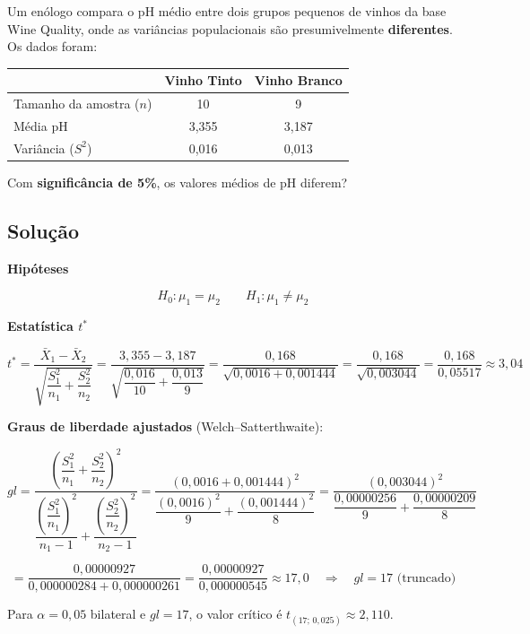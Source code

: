\documentclass[12pt,a4paper]{article}
\begin{document}
Um enólogo compara o pH médio entre dois grupos pequenos de vinhos da base Wine Quality,
onde as variâncias populacionais são presumivelmente \textbf{diferentes}. Os dados foram:

\begin{center}
\begin{tabular}{lcc}
  \toprule
  & \textbf{Vinho Tinto} & \textbf{Vinho Branco} \\
  \midrule
  Tamanho da amostra ($n$) & 10      & 9       \\
  Média pH                 & 3{,}355 & 3{,}187 \\
  Variância ($S^2$)        & 0{,}016 & 0{,}013 \\
  \bottomrule
\end{tabular}
\end{center}

Com \textbf{significância de 5\%}, os valores médios de pH diferem?

\subsection*{Solução}

\textbf{Hipóteses}

\[
  H_0: \mu_1 = \mu_2 \qquad H_1: \mu_1 \neq \mu_2
\]

\textbf{Estatística $t^*$}

\[
  t^* = \frac{\bar{X}_1 - \bar{X}_2}
             {\sqrt{\dfrac{S_1^2}{n_1} + \dfrac{S_2^2}{n_2}}}
      = \frac{3{,}355 - 3{,}187}
             {\sqrt{\dfrac{0{,}016}{10} + \dfrac{0{,}013}{9}}}
      = \frac{0{,}168}{\sqrt{0{,}0016 + 0{,}001444}}
      = \frac{0{,}168}{\sqrt{0{,}003044}}
      = \frac{0{,}168}{0{,}05517}
      \approx 3{,}04
\]

\textbf{Graus de liberdade ajustados} (Welch--Satterthwaite):

\[
  gl = \frac{\left(\dfrac{S_1^2}{n_1} + \dfrac{S_2^2}{n_2}\right)^2}
            {\dfrac{\left(\dfrac{S_1^2}{n_1}\right)^2}{n_1 - 1}
             + \dfrac{\left(\dfrac{S_2^2}{n_2}\right)^2}{n_2 - 1}}
     = \frac{(0{,}0016 + 0{,}001444)^2}
            {\dfrac{(0{,}0016)^2}{9} + \dfrac{(0{,}001444)^2}{8}}
     = \frac{(0{,}003044)^2}{\dfrac{0{,}00000256}{9} + \dfrac{0{,}00000209}{8}}
\]

\[
  = \frac{0{,}00000927}{0{,}000000284 + 0{,}000000261}
  = \frac{0{,}00000927}{0{,}000000545}
  \approx 17{,}0
  \quad \Rightarrow \quad gl = 17 \text{ (truncado)}
\]

Para $\alpha = 0{,}05$ bilateral e $gl = 17$, o valor crítico é
$t_{(17;\,0{,}025)} \approx 2{,}110$.
\end{document}

